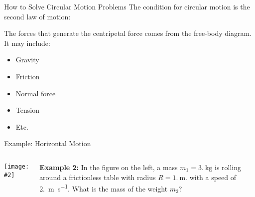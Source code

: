 \documentclass[12pt,compress,aspectratio=169]{beamer}
\newcommand{\pic}[2]{\texttt{[image: \#2]}}
\newcommand{\mb}[1]{\ensuremath\mathbf{#1}}
\newcommand{\eq}[2]{\vspace{#1}{\Large\begin{displaymath}#2\end{displaymath}}}
\begin{document}
%
\begin{frame}{How to Solve Circular Motion Problems}
  The condition for circular motion is the second law of motion:

  \eq{-.2in}{
    \mb{F}_c=\sum\mb{F}=m\mb{a}_c
  }
  
  The forces that generate the centripetal force comes from the free-body
  diagram. It may include:
  \begin{itemize}
  \item Gravity
  \item Friction
  \item Normal force
  \item Tension
  \item Etc.
  \end{itemize}
\end{frame}


\begin{frame}{Example: Horizontal Motion}
  \begin{columns}
    \pic{1}{puck-on-table.png}
    
    \textbf{Example 2:} In the figure on the left, a mass
    $m_1=\SI{3.}{\kilo\gram}$ is rolling around a frictionless table with
    radius $R=\SI{1.}{\metre}$. with a speed of \SI{2.}{\metre\per\second}.
    What is the mass of the weight $m_2$?
  \end{columns}
\end{frame}
\end{document}
